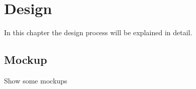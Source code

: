 \chapter{Design}
In this chapter the design process will be explained in detail.

\section{Mockup}
Show some mockups